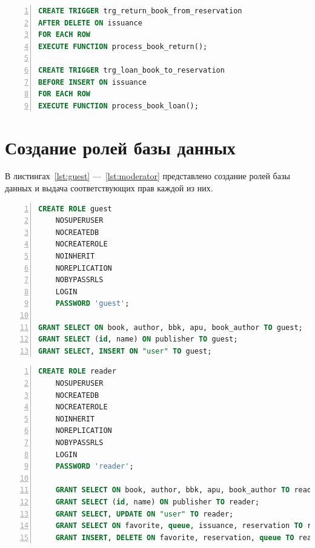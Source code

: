 \begin{center}
	\captionsetup{justification=raggedright,singlelinecheck=off}
	\begin{lstlisting}[language=sql, frame=single, numbers=left, label=lst:tr_2, caption=Создание тригеров для таблицы issuance]
CREATE TRIGGER trg_return_book_from_reservation
AFTER DELETE ON issuance
FOR EACH ROW
EXECUTE FUNCTION process_book_return();

CREATE TRIGGER trg_loan_book_to_reservation
BEFORE INSERT ON issuance
FOR EACH ROW
EXECUTE FUNCTION process_book_loan();
	\end{lstlisting}
\end{center}

\section{Создание ролей базы данных}
В листингах~\ref{lst:guest} ---~\ref{lst:moderator} представлено создание ролей базы данных и выдача соответствующих прав каждой из них.

\begin{center}
	\captionsetup{justification=raggedright,singlelinecheck=off}
	\begin{lstlisting}[language=sql, frame=single, numbers=left, label=lst:guest, caption=Создание роли гостя]
CREATE ROLE guest
	NOSUPERUSER
	NOCREATEDB
	NOCREATEROLE
	NOINHERIT
	NOREPLICATION
	NOBYPASSRLS
	LOGIN
	PASSWORD 'guest';
	
GRANT SELECT ON book, author, bbk, apu, book_author TO guest;
GRANT SELECT (id, name) ON publisher TO guest;
GRANT SELECT, INSERT ON "user" TO guest;
	\end{lstlisting}
\end{center}

\begin{center}
	\captionsetup{justification=raggedright,singlelinecheck=off}
	\begin{lstlisting}[language=sql, frame=single, numbers=left, caption=Создание роли читателя]
CREATE ROLE reader
	NOSUPERUSER
	NOCREATEDB
	NOCREATEROLE
	NOINHERIT
	NOREPLICATION
	NOBYPASSRLS
	LOGIN
	PASSWORD 'reader';
	
	GRANT SELECT ON book, author, bbk, apu, book_author TO reader;
	GRANT SELECT (id, name) ON publisher TO reader;
	GRANT SELECT, UPDATE ON "user" TO reader;
	GRANT SELECT ON favorite, queue, issuance, reservation TO reader;
	GRANT INSERT, DELETE ON favorite, reservation, queue TO reader;
	\end{lstlisting}
\end{center}


